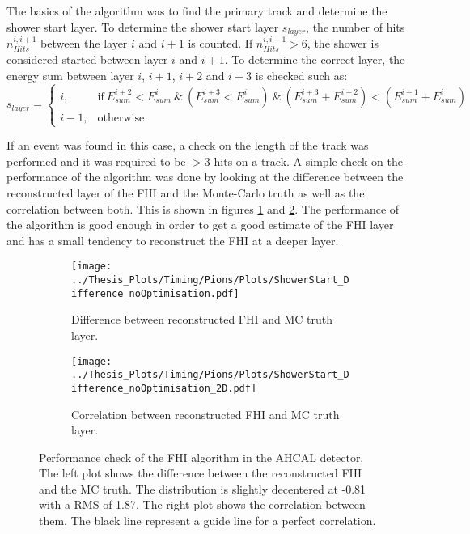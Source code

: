 The basics of the algorithm was to find the primary track and determine the shower start layer. To determine the shower start layer $s_{layer}$, the number of hits $n_{Hits}^{i, i+1}$ between the layer $i$ and $i+1$ is counted. If $n_{Hits}^{i, i+1} > 6$, the shower is considered started between layer $i$ and $i+1$. To determine the correct layer, the energy sum between layer $i$, $i+1$, $i+2$ and $i+3$ is checked such as:
\begin{equation*}
	s_{layer} =
	\begin{cases}
		i, & \text{if} \: E_{sum}^{i+2} < E_{sum}^{i} \:\&\: (E_{sum}^{i+3} < E_{sum}^{i}) \:\&\: (E_{sum}^{i+3} + E_{sum}^{i+2}) < (E_{sum}^{i+1} + E_{sum}^{i}) \\
		i-1, & \text{otherwise}
	\end{cases}
\end{equation*}

If an event was found in this case, a check on the length of the track was performed and it was required to be $>3$ hits on a track. A simple check on the performance of the algorithm was done by looking at the difference between the reconstructed layer of the FHI and the Monte-Carlo truth as well as the correlation between both. This is shown in figures \ref{fig:Diff_FHI_RecoMC} and \ref{fig:Corr_FHI_RecoMC}. The performance of the algorithm is good enough in order to get a good estimate of the FHI layer and has a small tendency to reconstruct the FHI at a deeper layer.

\begin{figure}[htbp!]
	\begin{subfigure}[t]{0.5\textwidth}
		\centering
		\texttt{[image: ../Thesis\_Plots/Timing/Pions/Plots/ShowerStart\_Difference\_noOptimisation.pdf]}
		\caption{Difference between reconstructed FHI and MC truth layer.}\label{fig:Diff_FHI_RecoMC}
	\end{subfigure}
	\hfill
	\begin{subfigure}[t]{0.5\textwidth}
		\centering
		\texttt{[image: ../Thesis\_Plots/Timing/Pions/Plots/ShowerStart\_Difference\_noOptimisation\_2D.pdf]}
		\caption{Correlation between reconstructed FHI and MC truth layer.}\label{fig:Corr_FHI_RecoMC}
	\end{subfigure}
	\caption{Performance check of the FHI algorithm in the AHCAL detector. The left plot shows the difference between the reconstructed FHI and the MC truth. The distribution is slightly decentered at -0.81 with a RMS of 1.87. The right plot shows the correlation between them. The black line represent a guide line for a perfect correlation.}
	\label{fig:FHIAlgo}
\end{figure}

